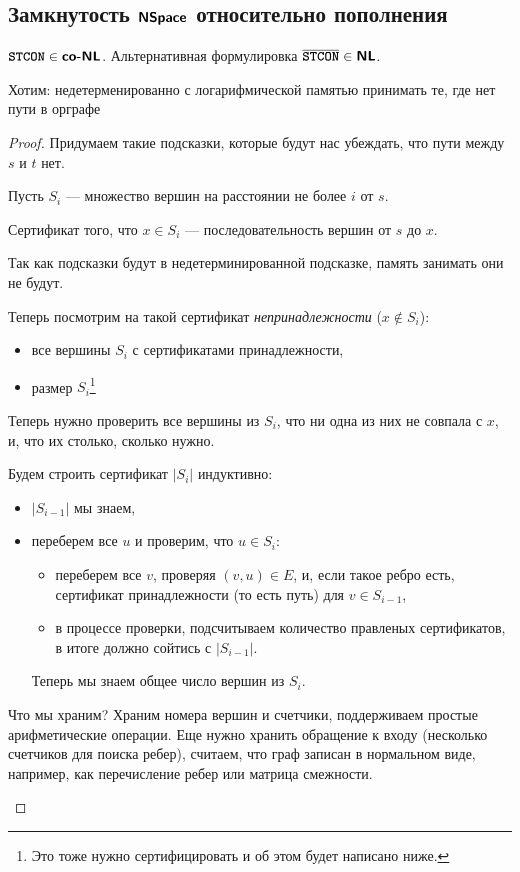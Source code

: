 \subsection{Замкнутость $\textmd{\textbf{\textsf{NSpace}}}$ относительно пополнения}
\begin{thm}
     $ {\textbf{\texttt{STCON}}} \in \textmd{\textbf{\textsf{co-NL}}}$. Альтернативная формулировка $ \overline{{\textbf{\texttt{STCON}}}} \in \textmd{\textbf{\textsf{NL}}}$. 
\end{thm}
    Хотим: недетерменированно с логарифмической памятью принимать те, где нет пути в орграфе
\begin{proof}
	Придумаем такие подсказки, которые будут нас убеждать, что пути между $ s$ и $ t$ нет.

	Пусть $ S_i$ --- множество вершин на расстоянии не более $ i$ от $ s$.

	Сертификат того, что $ x \in S_i$ --- последовательность вершин от $ s $ до $ x$.
	
	Так как подсказки будут в недетерминированной подсказке, память занимать они не будут.

	Теперь посмотрим на такой сертификат \textit{непринадлежности} ($ x \notin S_i$):
	\begin{itemize}[noitemsep]
		\item все вершины  $ S_i$ с сертификатами принадлежности,
		\item размер $ S_i$\footnote{Это тоже нужно сертифицировать и об этом будет написано ниже.}
	\end{itemize}

	Теперь нужно проверить все вершины из $ S_i$, что ни одна из них не совпала с $ x$, и, что их столько, сколько нужно.

	Будем строить сертификат $ \lvert S_i \rvert $ индуктивно:
	\begin{itemize}[noitemsep]
		\item $ \lvert S_{i-1} \rvert $ мы знаем,
		\item переберем все $ u$ и проверим, что  $ u \in S_i$:
			\begin{itemize}[noitemsep]
				\item переберем все $ v $, проверяя $ (v, u) \in E$, и, если такое ребро есть, сертификат принадлежности (то есть путь) для $ v \in S_{i-1}$,
				\item в процессе проверки, подсчитываем количество правленых сертификатов, в итоге должно сойтись с $ \lvert S_{i-1} \rvert $.
			\end{itemize}
			Теперь мы знаем общее число вершин из $ S_{i}$.
	\end{itemize}
	\begin{note}
		Что мы храним? Храним номера вершин и счетчики, поддерживаем простые арифметические операции. Еще нужно хранить обращение к входу (несколько счетчиков для поиска ребер), считаем, что граф записан в нормальном виде, например, как перечисление ребер или матрица смежности.
	\end{note}
\end{proof}

